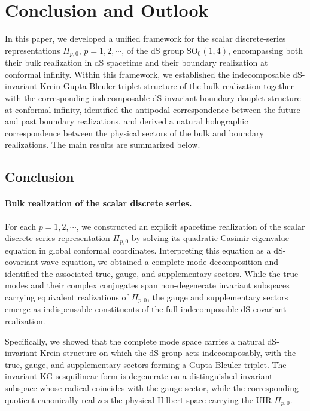 \documentclass[aps,twocolumn,nofootinbib]{revtex4}
\begin{document}
{%
\section{Conclusion and Outlook}\label{Sec. conclusion}

In this paper, we developed a unified framework for the scalar discrete-series representations $\Pi_{p,0}$, $p=1,2,\cdots$, of the dS group $\mathrm{SO}_0(1,4)$, encompassing both their bulk realization in dS spacetime and their boundary realization at conformal infinity. Within this framework, we established the indecomposable dS-invariant Krein-Gupta-Bleuler triplet structure of the bulk realization together with the corresponding indecomposable dS-invariant boundary douplet structure at conformal infinity, identified the antipodal correspondence between the future and past boundary realizations, and derived a natural holographic correspondence between the physical sectors of the bulk and boundary realizations. The main results are summarized below.


\subsection{Conclusion}

\paragraph{Bulk realization of the scalar discrete series.} For each $p=1,2,\cdots$, we constructed an explicit spacetime realization of the scalar discrete-series representation $\Pi_{p,0}$ by solving its quadratic Casimir eigenvalue equation in global conformal coordinates. Interpreting this equation as a dS-covariant wave equation, we obtained a complete mode decomposition and identified the associated true, gauge, and supplementary sectors. While the true modes and their complex conjugates span non-degenerate invariant subspaces carrying equivalent realizations of $\Pi_{p,0}$, the gauge and supplementary sectors emerge as indispensable constituents of the full indecomposable dS-covariant realization.

Specifically, we showed that the complete mode space carries a natural dS-invariant Krein structure on which the dS group acts indecomposably, with the true, gauge, and supplementary sectors forming a Gupta-Bleuler triplet. The invariant KG sesquilinear form is degenerate on a distinguished invariant subspace whose radical coincides with the gauge sector, while the corresponding quotient canonically realizes the physical Hilbert space carrying the UIR $\Pi_{p,0}$.

}
\end{document}
